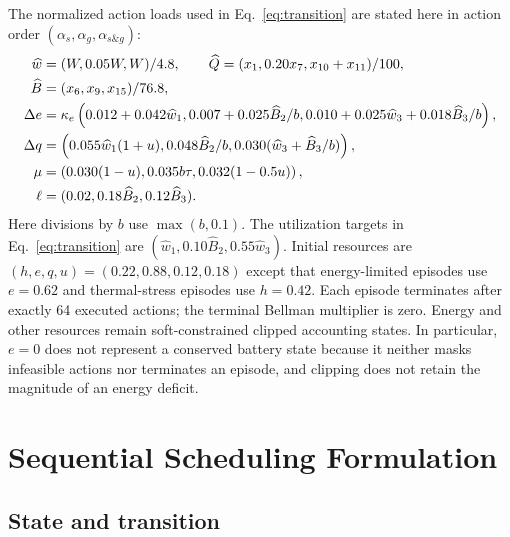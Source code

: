 \documentclass[11pt]{article}
\begin{document}
The normalized action loads used in Eq.~\eqref{eq:transition} are stated here in action order $(\alpha_s,\alpha_g,\alpha_{s\&g})$:
\begin{align}
\widehat w&=(W,0.05W,W)/4.8,\qquad
\widehat Q=(x_1,0.20x_7,x_{10}+x_{11})/100,\notag\\
\widehat B&=(x_6,x_9,x_{15})/76.8,\notag\\
\Delta e&=\kappa_e\left(0.012+0.042\widehat w_1,
0.007+0.025\widehat B_2/b,
0.010+0.025\widehat w_3+0.018\widehat B_3/b\right),\notag\\
\Delta q&=\left(0.055\widehat w_1(1+u),
0.048\widehat B_2/b,
0.030(\widehat w_3+\widehat B_3/b)\right),\notag\\
\mu&=\left(0.030(1-u),0.035b\tau,0.032(1-0.5u)\right),\notag\\
\ell&=(0.02,0.18\widehat B_2,0.12\widehat B_3).
\label{eq:action_loads}
\end{align}
\color{red}%
Here divisions by $b$ use $\max(b,0.1)$. The utilization targets in Eq.~\eqref{eq:transition} are $(\widehat w_1,0.10\widehat B_2,0.55\widehat w_3)$. Initial resources are $(h,e,q,u)=(0.22,0.88,0.12,0.18)$ except that energy-limited episodes use $e=0.62$ and thermal-stress episodes use $h=0.42$. Each episode terminates after exactly 64 executed actions; the terminal Bellman multiplier is zero. Energy and other resources remain soft-constrained clipped accounting states. In particular, $e=0$ does not represent a conserved battery state because it neither masks infeasible actions nor terminates an episode, and clipping does not retain the magnitude of an energy deficit.
\color{black}%

\section{Sequential Scheduling Formulation}
\label{sec:mdp}

\subsection{State and transition}
\end{document}
